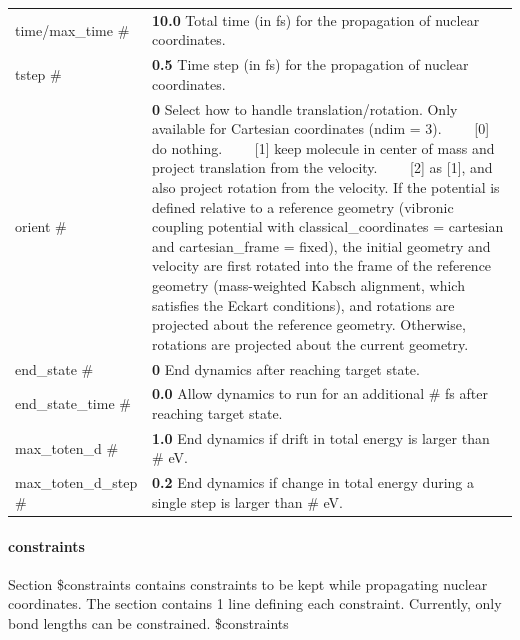 \documentclass{report}
\newcommand{\tabitem}{~~\llap{--}~~}
\begin{document}
\begin{tabularx}{\textwidth}{ m{3.5cm} X }
time/max\_time \#	&
	\textbf{10.0} \newline
	Total time (in fs) for the propagation of nuclear coordinates.  \\

tstep \#		&
	\textbf{0.5} \newline
	Time step (in fs) for the propagation of nuclear coordinates.  \\

orient \#		&
	\textbf{0} \newline
	Select how to handle translation/rotation. Only available for Cartesian coordinates (ndim = 3). \newline
	\tabitem [0] do nothing. \newline
	\tabitem [1] keep molecule in center of mass and project translation from the velocity. \newline
	\tabitem [2] as [1], and also project rotation from the velocity. If the potential is defined relative to a reference geometry (vibronic coupling potential with classical\_coordinates = cartesian and cartesian\_frame = fixed), the initial geometry and velocity are first rotated into the frame of the reference geometry (mass-weighted Kabsch alignment, which satisfies the Eckart conditions), and rotations are projected about the reference geometry. Otherwise, rotations are projected about the current geometry. \\

end\_state \#		&
	\textbf{0} \newline
	End dynamics after reaching target state. \\

end\_state\_time \#	&
	\textbf{0.0} \newline
	Allow dynamics to run for an additional \# fs after reaching target state. \\

max\_toten\_d \#	&
	\textbf{1.0} \newline
	End dynamics if drift in total energy is larger than \# eV. \\

max\_toten\_d\_step \#	&
	\textbf{0.2} \newline
	End dynamics if change in total energy during a single step is larger than \# eV. \\
\end{tabularx}


\paragraph{constraints}
Section \$constraints contains constraints to be kept while propagating nuclear coordinates. The section contains 1 line defining each constraint. Currently, only bond lengths can be constrained. \newline
\$constraints
\end{document}
